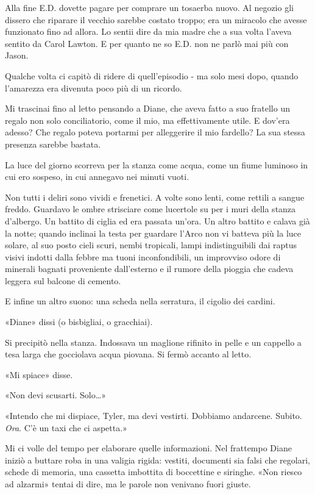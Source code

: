 Alla fine E.D. dovette pagare per comprare un tosaerba nuovo. Al negozio
gli dissero che riparare il vecchio sarebbe costato troppo; era un
miracolo che avesse funzionato fino ad allora. Lo sentii dire da mia
madre che a sua volta l'aveva sentito da Carol Lawton. E per quanto ne
so E.D. non ne parlò mai più con Jason.

Qualche volta ci capitò di ridere di quell'episodio - ma solo mesi dopo,
quando l'amarezza era divenuta poco più di un ricordo.

\separatorefiori

Mi trascinai fino al letto pensando a Diane, che aveva fatto a suo
fratello un regalo non solo conciliatorio, come il mio, ma
effettivamente utile. E dov'era adesso? Che regalo poteva portarmi per
alleggerire il mio fardello? La sua stessa presenza sarebbe bastata.

La luce del giorno scorreva per la stanza come acqua, come un fiume
luminoso in cui ero sospeso, in cui annegavo nei minuti vuoti.

Non tutti i deliri sono vividi e frenetici. A volte sono lenti, come
rettili a sangue freddo. Guardavo le ombre strisciare come lucertole su
per i muri della stanza d'albergo. Un battito di ciglia ed era passata
un'ora. Un altro battito e calava già la notte; quando inclinai la testa
per guardare l'Arco non vi batteva più la luce solare, al suo posto
cieli scuri, nembi tropicali, lampi indistinguibili dai raptus visivi
indotti dalla febbre ma tuoni inconfondibili, un improvviso odore di
minerali bagnati proveniente dall'esterno e il rumore della pioggia che
cadeva leggera sul balcone di cemento.

E infine un altro suono: una scheda nella serratura, il cigolio dei
cardini.

«Diane» dissi (o bisbigliai, o gracchiai).

Si precipitò nella stanza. Indossava un maglione rifinito in pelle e un
cappello a tesa larga che gocciolava acqua piovana. Si fermò accanto al
letto.

«Mi spiace» disse.

«Non devi scusarti. Solo\ldots»

«Intendo che mi dispiace, Tyler, ma devi vestirti. Dobbiamo andarcene.
Subito. \emph{Ora}. C'è un taxi che ci aspetta.»

Mi ci volle del tempo per elaborare quelle informazioni. Nel frattempo
Diane iniziò a buttare roba in una valigia rigida: vestiti, documenti
sia falsi che regolari, schede di memoria, una cassetta imbottita di
boccettine e siringhe. «Non riesco ad alzarmi» tentai di dire, ma le
parole non venivano fuori giuste.

